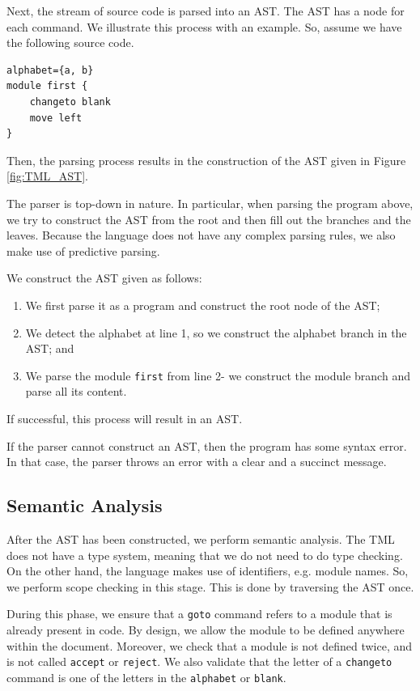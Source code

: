 Next, the stream of source code is parsed into an AST. The AST has a node for each command. We illustrate this process with an example. So, assume we have the following source code.
\begin{lstlisting}[language=TML]
alphabet={a, b}
module first {
    changeto blank
    move left
}
\end{lstlisting}
Then, the parsing process results in the construction of the AST given in Figure \ref{fig:TML_AST}. 

The parser is top-down in nature. In particular, when parsing the program above, we try to construct the AST from the root and then fill out the branches and the leaves. Because the language does not have any complex parsing rules, we also make use of predictive parsing.

We construct the AST given as follows:
\begin{enumerate}
    \item We first parse it as a program and construct the root node of the AST;
    \item We detect the alphabet at line 1, so we construct the alphabet branch in the AST; and 
    \item We parse the module \texttt{first} from line 2- we construct the module branch and parse all its content.
\end{enumerate}
If successful, this process will result in an AST.

If the parser cannot construct an AST, then the program has some syntax error. In that case, the parser throws an error with a clear and a succinct message.

\subsection{Semantic Analysis}
After the AST has been constructed, we perform semantic analysis. The TML does not have a type system, meaning that we do not need to do type checking. On the other hand, the language makes use of identifiers, e.g. module names. So, we perform scope checking in this stage. This is done by traversing the AST once.

During this phase, we ensure that a \texttt{goto} command refers to a module that is already present in code. By design, we allow the module to be defined anywhere within the document. Moreover, we check that a module is not defined twice, and is not called \texttt{accept} or \texttt{reject}. We also validate that the letter of a \texttt{changeto} command is one of the letters in the \texttt{alphabet} or \texttt{blank}. 

